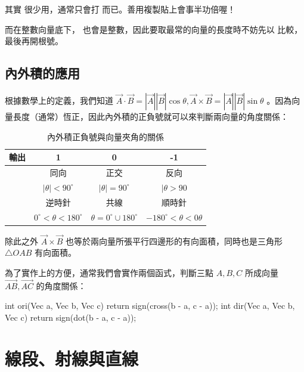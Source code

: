 \documentclass[main.tex]{subfiles}
\begin{document}
其實 \inline{+ * /} 很少用，通常只會打 \inline{-} 而已。善用複製貼上會事半功倍喔！

而在整數向量底下，  也會是整數，因此要取最常的向量的長度時不妨先以  比較，最後再開根號。


\subsection{內外積的應用}

根據數學上的定義，我們知道 $\vec{A} \cdot \vec{B} = |\vec{A}||\vec{B}| \cos \theta, \vec{A} \times \vec{B} = |\vec{A}||\vec{B}| \sin \theta$ 。因為向量長度（通常）恆正，因此內外積的正負號就可以來判斷兩向量的角度關係：

\begin{table}[h]
	\centering
	\begin{tabular}{ c | c c c }
		輸出 & 1 & 0 & -1 \\ \hline
		\inline{sign(dot(A, B))} & 同向 & 正交 & 反向 \\
		& $|\theta| < 90^\circ$ & $|\theta| = 90^\circ$ & $|\theta > 90$ \\ \hline
		\inline{sign(cross(A, B))} & 逆時針 & 共線  & 順時針 \\
		& $0^\circ < \theta < 180^\circ$ & $\theta = 0^\circ \cup 180 ^\circ$ & $-180^\circ < \theta < 0\theta$ \\ \hline
	\end{tabular}
	\caption{內外積正負號與向量夾角的關係}
\end{table}

除此之外 $\vec{A} \times \vec{B}$ 也等於兩向量所張平行四邊形的有向面積，同時也是三角形 $\triangle OAB$ 有向面積。

為了實作上的方便，通常我們會實作兩個函式，判斷三點 $A, B, C$ 所成向量 $\vec{AB}, \vec{AC}$ 的角度關係：

\begin{C++}
int ori(Vec a, Vec b, Vec c)
{ return sign(cross(b - a, c - a)); }
int dir(Vec a, Vec b, Vec c)
{ return sign(dot(b - a, c - a)); }
\end{C++}

\section{線段、射線與直線}
\end{document}
